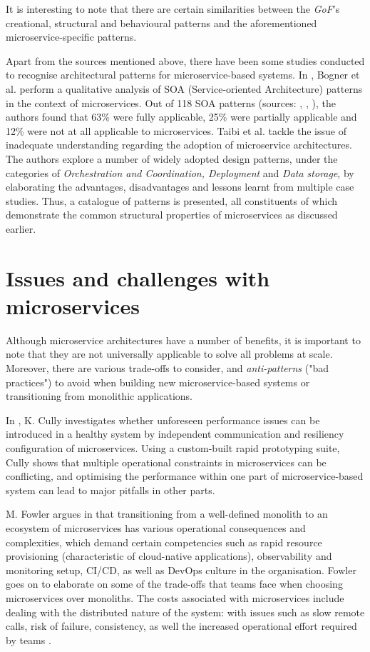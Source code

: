 It is interesting to note that there are certain similarities between the \textit{GoF}'s creational, structural and
behavioural patterns \cite{gof94} and the aforementioned microservice-specific patterns. \linebreak

Apart from the sources mentioned above, there have been some studies conducted to recognise architectural patterns for
microservice-based systems. In \cite{bogner18}, Bogner et al. perform a qualitative analysis of SOA (Service-oriented
Architecture) patterns in the context of microservices. Out of 118 SOA patterns (sources: \cite{erl09}, \cite{erl12},
\cite{rotem12}), the authors found that 63\% were fully applicable, 25\% were partially applicable and 12\% were not
at all applicable to microservices. Taibi et al. \cite{taibi18} tackle the issue of inadequate understanding regarding
the adoption of microservice architectures. The authors explore a number of widely adopted design patterns, under the
categories of \textit{Orchestration and Coordination, Deployment} and \textit{Data storage}, by elaborating the advantages,
disadvantages and lessons learnt from multiple case studies. Thus, a catalogue of patterns is presented, all constituents
of which demonstrate the common structural properties of microservices as discussed earlier.

\section{Issues and challenges with microservices}

Although microservice architectures have a number of benefits, it is important to note that they are not universally
applicable to solve all problems at scale. Moreover, there are various trade-offs to consider, and \textit{anti-patterns}
("bad practices") to avoid when building new microservice-based systems or transitioning from monolithic applications.

In \cite{cully20}, K. Cully investigates whether unforeseen performance issues can be introduced in a healthy system by
independent communication and resiliency configuration of microservices. Using a custom-built rapid prototyping suite,
Cully shows that multiple operational constraints in microservices can be conflicting, and optimising the performance
within one part of microservice-based system can lead to major pitfalls in other parts.

M. Fowler argues in \cite{fowler14} that transitioning from a well-defined monolith to an ecosystem of microservices
has various operational consequences and complexities, which demand certain competencies such as rapid resource
provisioning (characteristic of cloud-native applications), observability and monitoring setup, CI/CD, as well as
DevOps culture in the organisation. Fowler goes on to elaborate on some of the trade-offs that teams face when choosing
microservices over monoliths. The costs associated with microservices include dealing with the distributed nature of the
system: with issues such as slow remote calls, risk of failure, consistency, as well the increased operational effort
required by teams \cite{fowler15}.

